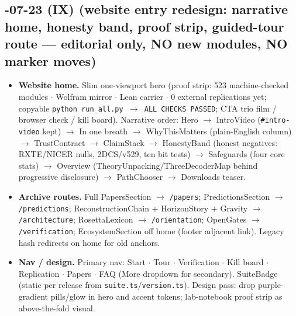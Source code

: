 \subsection*{-07-23 (IX) (website entry redesign: narrative home, honesty band, proof strip, guided-tour route --- editorial only, NO new modules, NO marker moves)}
\begin{itemize}[leftmargin=1.5em]
\item \textbf{Website home.} Slim one-viewport hero (proof strip: 523 machine-checked modules $\cdot$ Wolfram mirror $\cdot$ Lean carrier $\cdot$ 0 external replications yet; copyable \texttt{python run\_all.py $\to$ ALL CHECKS PASSED}; CTA trio film / browser check / kill board). Narrative order: Hero $\to$ IntroVideo (\texttt{\#intro-video} kept) $\to$ In one breath $\to$ WhyThisMatters (plain-English column) $\to$ TrustContract $\to$ ClaimStack $\to$ HonestyBand (honest negatives: RXTE/NICER nulls, 2DCS/v529, ten bit tests) $\to$ Safeguards (four core stats) $\to$ Overview (TheoryUnpacking/ThreeDecoderMap behind progressive disclosure) $\to$ PathChooser $\to$ Downloads teaser.
\item \textbf{Archive routes.} Full PapersSection $\to$ \texttt{/papers}; PredictionsSection $\to$ \texttt{/predictions}; ReconstructionChain $+$ HorizonStory $+$ Gravity $\to$ \texttt{/architecture}; RosettaLexicon $\to$ \texttt{/orientation}; OpenGates $\to$ \texttt{/verification}; EcosystemSection off home (footer adjacent link). Legacy hash redirects on home for old anchors.
\item \textbf{Nav / design.} Primary nav: Start $\cdot$ Tour $\cdot$ Verification $\cdot$ Kill board $\cdot$ Replication $\cdot$ Papers $\cdot$ FAQ (More dropdown for secondary). SuiteBadge (static per release from \texttt{suite.ts}/\texttt{version.ts}). Design pass: drop purple-gradient pills/glow in hero and accent tokens; lab-notebook proof strip as above-the-fold visual.
\end{itemize}

